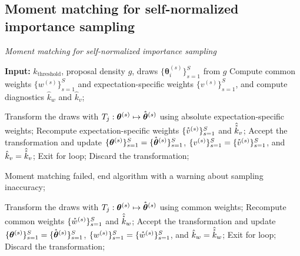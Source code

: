 \documentclass[12pt]{article}
\newcommand{\ome}{v}
\newcommand{\transf}{\accentset{\ast}}
\begin{document}
%
%
%


%



\onecolumn
\clearpage


\begin{appendices}
%






\section{Moment matching for self-normalized importance sampling} \label{sec:appendix-alg}



\begin{algorithm*}[htb]
\caption{\em Moment matching for self-normalized importance sampling}\label{alg:mm-snis-general}
\begin{algorithmic}[1]
\STATE \textbf{Input:} $k_{\text{threshold}}$, proposal density $g$, draws $\{ \boldsymbol{\theta}_i^{(s)} \}_{s = 1}^S$ from $g$
\STATE Compute common weights $\{  w^{(s)}  \}_{s = 1}^S$ and expectation-specific weights $\{  \ome^{(s)}  \}_{s = 1}^S$, and compute diagnostics $\hat{k}_w$ and $\hat{k}_{\ome}$;
%
%

\WHILE{$\hat{k}_{\ome} > k_{\text{threshold}}$}

%
%
\STATE Transform the draws with $T_j: \boldsymbol{\theta}^{(s)} \mapsto \transf{\boldsymbol{\theta}}^{(s)}$ using absolute expectation-specific weights;
\STATE Recompute expectation-specific weights $\{  \transf{\ome}^{(s)}  \}_{s = 1}^S$ and $\hat{\transf{k}}_{\ome}$;
\IF{$\hat{\transf{k}}_{\ome} < \hat{k}_{\ome}$}
\STATE Accept the transformation and update $\{ \boldsymbol{\theta}^{(s)} \}_{s = 1}^S = \{ \transf{\boldsymbol{\theta}}^{(s)} \}_{s = 1}^S$, $\{  \ome^{(s)} \}_{s = 1}^S = \{ \transf{\ome}^{(s)} \}_{s = 1}^S$, and $\hat{k}_{\ome} = \hat{\transf{k}}_{\ome}$;
\STATE Exit for loop;
\ELSE
\STATE Discard the transformation;
\ENDIF

\STATE Moment matching failed, end algorithm with a warning about sampling inaccuracy;
\ENDIF

\ENDFOR
\ENDWHILE





%
%
\STATE Transform the draws with $T_j: \boldsymbol{\theta}^{(s)} \mapsto \transf{\boldsymbol{\theta}}^{(s)}$ using common weights;
\STATE Recompute common weights $\{  \transf{w}^{(s)}  \}_{s = 1}^S$ and $\hat{\transf{k}}_w$;
\IF{$\hat{\transf{k}}_w < \hat{k}_w$}
\STATE Accept the transformation and update $\{ \boldsymbol{\theta}^{(s)} \}_{s = 1}^S = \{ \transf{\boldsymbol{\theta}}^{(s)} \}_{s = 1}^S$, $\{  w^{(s)} \}_{s = 1}^S = \{ \transf{w}^{(s)} \}_{s = 1}^S$, and $\hat{k}_w = \hat{\transf{k}}_w$;
\STATE Exit for loop;
\ELSE
\STATE Discard the transformation;
\ENDIF


\end{algorithmic}
\end{algorithm*}
\end{appendices}
\end{document}

